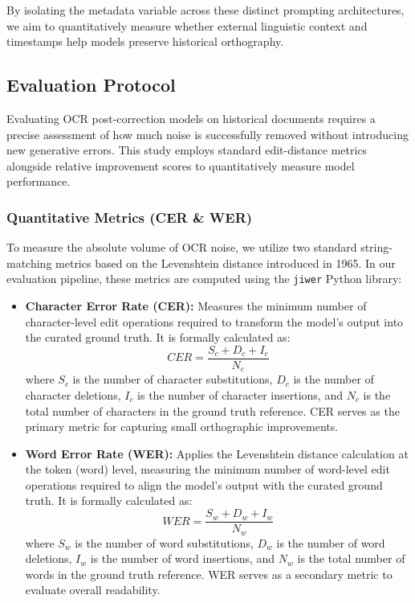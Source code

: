 \documentclass[11pt]{extarticle}
\begin{document}
By isolating the metadata variable across these distinct prompting architectures, we aim to quantitatively measure whether external linguistic context and timestamps help models preserve historical orthography.

\subsection{Evaluation Protocol}
Evaluating OCR post-correction models on historical documents requires a precise assessment of how much noise is successfully removed without introducing new generative errors. This study employs standard edit-distance metrics alongside relative improvement scores to quantitatively measure model performance.

\subsubsection{Quantitative Metrics (CER \& WER)}
To measure the absolute volume of OCR noise, we utilize two standard string-matching metrics based on the Levenshtein distance introduced in 1965. In our evaluation pipeline, these metrics are computed using the \texttt{jiwer} Python library:
\begin{itemize}
    \item \textbf{Character Error Rate (CER):} Measures the minimum number of character-level edit operations required to transform the model's output into the curated ground truth. It is formally calculated as:
    \begin{equation}
        CER = \frac{S_{c} + D_{c} + I_{c}}{N_{c}}
    \end{equation}
    where $S_{c}$ is the number of character substitutions, $D_{c}$ is the number of character deletions, $I_{c}$ is the number of character insertions, and $N_{c}$ is the total number of characters in the ground truth reference. CER serves as the primary metric for capturing small orthographic improvements.
    
    \item \textbf{Word Error Rate (WER):} Applies the Levenshtein distance calculation at the token (word) level, measuring the minimum number of word-level edit operations required to align the model's output with the curated ground truth. It is formally calculated as:
    \begin{equation}
        WER = \frac{S_{w} + D_{w} + I_{w}}{N_{w}}
    \end{equation}
    where $S_{w}$ is the number of word substitutions, $D_{w}$ is the number of word deletions, $I_{w}$ is the number of word insertions, and $N_{w}$ is the total number of words in the ground truth reference. WER serves as a secondary metric to evaluate overall readability.
\end{itemize}
\end{document}
